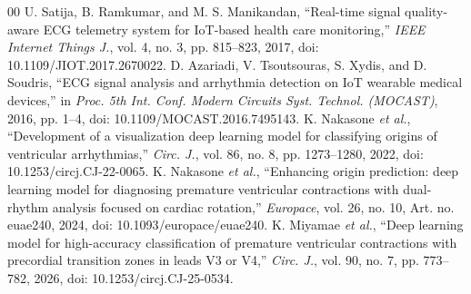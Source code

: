 \documentclass[conference,a4paper]{IEEEtran}
\begin{document}
\begin{thebibliography}{00}
 U. Satija, B. Ramkumar, and M. S. Manikandan, ``Real-time signal quality-aware ECG telemetry system for IoT-based health care monitoring,'' \emph{IEEE Internet Things J.}, vol. 4, no. 3, pp. 815--823, 2017, doi: 10.1109/JIOT.2017.2670022.
 D. Azariadi, V. Tsoutsouras, S. Xydis, and D. Soudris, ``ECG signal analysis and arrhythmia detection on IoT wearable medical devices,'' in \emph{Proc. 5th Int. Conf. Modern Circuits Syst. Technol. (MOCAST)}, 2016, pp. 1--4, doi: 10.1109/MOCAST.2016.7495143.
 K. Nakasone \emph{et al.}, ``Development of a visualization deep learning model for classifying origins of ventricular arrhythmias,'' \emph{Circ. J.}, vol. 86, no. 8, pp. 1273--1280, 2022, doi: 10.1253/circj.CJ-22-0065.
 K. Nakasone \emph{et al.}, ``Enhancing origin prediction: deep learning model for diagnosing premature ventricular contractions with dual-rhythm analysis focused on cardiac rotation,'' \emph{Europace}, vol. 26, no. 10, Art. no. euae240, 2024, doi: 10.1093/europace/euae240.
 K. Miyamae \emph{et al.}, ``Deep learning model for high-accuracy classification of premature ventricular contractions with precordial transition zones in leads V3 or V4,'' \emph{Circ. J.}, vol. 90, no. 7, pp. 773--782, 2026, doi: 10.1253/circj.CJ-25-0534.
\end{thebibliography}
\end{document}

